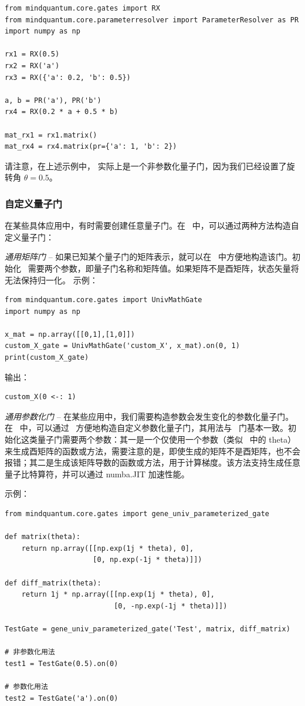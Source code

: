 \begin{lstlisting}
from mindquantum.core.gates import RX
from mindquantum.core.parameterresolver import ParameterResolver as PR
import numpy as np

rx1 = RX(0.5)
rx2 = RX('a')
rx3 = RX({'a': 0.2, 'b': 0.5})

a, b = PR('a'), PR('b')
rx4 = RX(0.2 * a + 0.5 * b)

mat_rx1 = rx1.matrix()
mat_rx4 = rx4.matrix(pr={'a': 1, 'b': 2})
\end{lstlisting}

请注意，在上述示例中， 实际上是一个非参数化量子门，因为我们已经设置了旋转角 $\theta = 0.5$。

\subsubsection{自定义量子门}
在某些具体应用中，有时需要创建任意量子门。在 \MindQuantum\ 中，可以通过两种方法构造自定义量子门：

\textit{通用矩阵门} -- 如果已知某个量子门的矩阵表示，就可以在 \MindQuantum\ 中方便地构造该门。初始化 \UnivMathGate\ 需要两个参数，即量子门名称和矩阵值。如果矩阵不是酉矩阵，状态矢量将无法保持归一化。
示例：
\begin{lstlisting}
from mindquantum.core.gates import UnivMathGate
import numpy as np

x_mat = np.array([[0,1],[1,0]])
custom_X_gate = UnivMathGate('custom_X', x_mat).on(0, 1)
print(custom_X_gate)
\end{lstlisting}

输出：
\begin{lstlisting}
custom_X(0 <-: 1)
\end{lstlisting}

\textit{通用参数化门} -- 在某些应用中，我们需要构造参数会发生变化的参数化量子门。在 \MindQuantum\ 中，可以通过 \geneunivparameterizedgate\ 方便地构造自定义参数化量子门，其用法与 \RX\ 门基本一致。初始化这类量子门需要两个参数：其一是一个仅使用一个参数（类似 \RX\ 中的 theta）来生成酉矩阵的函数或方法，需要注意的是，即使生成的矩阵不是酉矩阵，也不会报错；其二是生成该矩阵导数的函数或方法，用于计算梯度。该方法支持生成任意量子比特算符，并可以通过 numba.JIT 加速性能。

示例：
\begin{lstlisting}
from mindquantum.core.gates import gene_univ_parameterized_gate

def matrix(theta):
    return np.array([[np.exp(1j * theta), 0],
                     [0, np.exp(-1j * theta)]])

def diff_matrix(theta):
    return 1j * np.array([[np.exp(1j * theta), 0],
                          [0, -np.exp(-1j * theta)]])

TestGate = gene_univ_parameterized_gate('Test', matrix, diff_matrix)

# 非参数化用法
test1 = TestGate(0.5).on(0)

# 参数化用法
test2 = TestGate('a').on(0)
\end{lstlisting}

